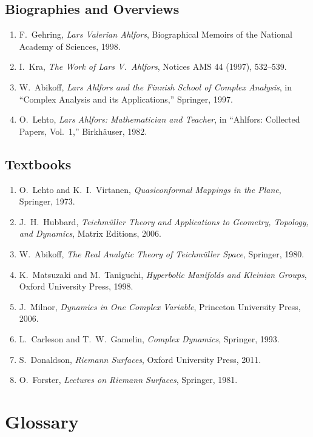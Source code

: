 \subsection*{Biographies and Overviews}
\begin{enumerate}
    \item F.\ Gehring, \textit{Lars Valerian Ahlfors}, Biographical Memoirs of the National Academy of Sciences, 1998.
    \item I.\ Kra, \textit{The Work of Lars V.\ Ahlfors}, Notices AMS 44 (1997), 532--539.
    \item W.\ Abikoff, \textit{Lars Ahlfors and the Finnish School of Complex Analysis}, in ``Complex Analysis and its Applications,'' Springer, 1997.
    \item O.\ Lehto, \textit{Lars Ahlfors: Mathematician and Teacher}, in ``Ahlfors: Collected Papers, Vol.\ 1,'' Birkh\"{a}user, 1982.
\end{enumerate}

\subsection*{Textbooks}
\begin{enumerate}
    \item O.\ Lehto and K.\ I.\ Virtanen, \textit{Quasiconformal Mappings in the Plane}, Springer, 1973.
    \item J.\ H.\ Hubbard, \textit{Teichm{\"u}ller Theory and Applications to Geometry, Topology, and Dynamics}, Matrix Editions, 2006.
    \item W.\ Abikoff, \textit{The Real Analytic Theory of Teichm{\"u}ller Space}, Springer, 1980.
    \item K.\ Matsuzaki and M.\ Taniguchi, \textit{Hyperbolic Manifolds and Kleinian Groups}, Oxford University Press, 1998.
    \item J.\ Milnor, \textit{Dynamics in One Complex Variable}, Princeton University Press, 2006.
    \item L.\ Carleson and T.\ W.\ Gamelin, \textit{Complex Dynamics}, Springer, 1993.
    \item S.\ Donaldson, \textit{Riemann Surfaces}, Oxford University Press, 2011.
    \item O.\ Forster, \textit{Lectures on Riemann Surfaces}, Springer, 1981.
\end{enumerate}

\section*{Glossary}

